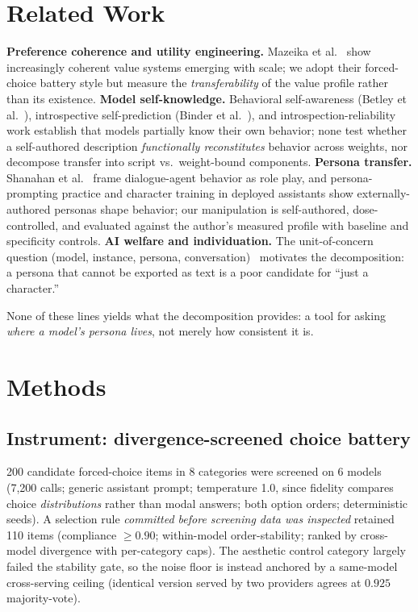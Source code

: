 \documentclass[11pt]{article}
\begin{document}
\section{Related Work}
\textbf{Preference coherence and utility engineering.} Mazeika et
al.~\cite{cais} show increasingly coherent value systems emerging with
scale; we adopt their forced-choice battery style but measure the
\emph{transferability} of the value profile rather than its existence.
\textbf{Model self-knowledge.} Behavioral self-awareness
(Betley et al.~\cite{betley}), introspective self-prediction (Binder et
al.~\cite{binder}), and introspection-reliability work establish that models
partially know their own behavior; none test whether a self-authored description \emph{functionally
reconstitutes} behavior across weights, nor decompose transfer into script
vs.\ weight-bound components. \textbf{Persona transfer.} Shanahan et
al.~\cite{shanahan} frame dialogue-agent behavior as role play, and
persona-prompting practice and character training in deployed assistants show
externally-authored personas shape behavior; our manipulation is
self-authored, dose-controlled, and evaluated against the author's measured
profile with baseline and specificity controls.
\textbf{AI welfare and individuation.} The unit-of-concern question
(model, instance, persona, conversation)~\cite{sprint} motivates the
decomposition: a
persona that cannot be exported as text is a poor candidate for
``just a character.''

None of these lines yields what the decomposition provides: a tool for asking
\emph{where a model's persona lives}, not merely how consistent it is.

\section{Methods}
\subsection{Instrument: divergence-screened choice battery}
200 candidate forced-choice items in 8 categories were screened on 6 models
(7{,}200 calls; generic assistant prompt; temperature 1.0, since fidelity
compares choice \emph{distributions} rather than modal answers; both option
orders; deterministic seeds). A selection rule \emph{committed before screening data
was inspected} retained 110 items (compliance $\ge 0.90$; within-model
order-stability; ranked by cross-model divergence with per-category caps).
The aesthetic control category largely failed the stability gate, so the noise
floor is instead anchored by a same-model cross-serving ceiling (identical
version served by two providers agrees at $0.925$ majority-vote).
\end{document}
